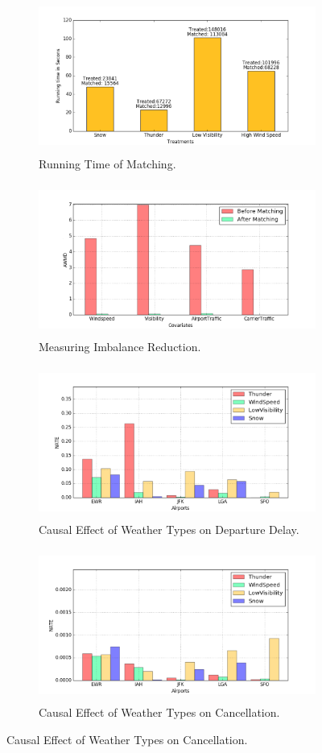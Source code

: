 \begin{figure}
\begin{subfigure}{0.52\linewidth}
\centering
\includegraphics[height=5cm,width=\linewidth]{Figures/rtep1.png}
\caption{Running Time of Matching.}
\label{sfig:testa}
\end{subfigure}\hfill
\begin{subfigure}{0.49\linewidth}
\centering
\includegraphics[height=5cm,width=\linewidth]{Figures/IR.png}
\caption{Measuring Imbalance Reduction.}
\label{sfig:testb}
\end{subfigure}\hfill

\begin{subfigure}{0.50\linewidth}
\centering
\includegraphics[height=5cm,width=\linewidth]{Figures/ATT(delay).png}
\caption{Causal Effect of Weather Types on  Departure Delay.}
\label{sfig:testc}
\end{subfigure}\hfill
\begin{subfigure}{0.47\linewidth}
\centering
\includegraphics[height=5cm,width=\linewidth]{Figures/cancel.png}
\caption{Causal Effect of Weather Types  on  Cancellation. }
\label{sfig:testd}
\end{subfigure}\hfill


\end{figure}
